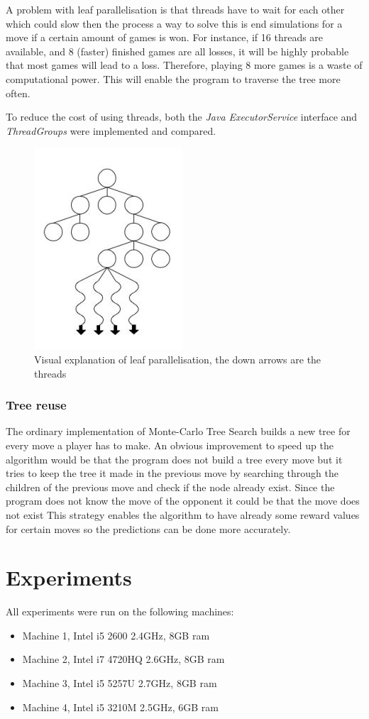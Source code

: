 \documentclass{ba-kecs}
\begin{document}
A problem with leaf parallelisation is that threads have to wait for each other which could slow then the process a way to solve this is end simulations for a move if a certain amount of games is won. For instance, if 16 threads are available, and 8 (faster) finished games are all losses, it will be highly probable that most games
will lead to a loss. Therefore, playing 8 more games is a waste of computational power. This will enable the program to traverse the tree more often.\cite{chaslot2008parallel}

To reduce the cost of using threads, both the \textit{Java ExecutorService} interface and \textit{ThreadGroups} were implemented and compared.
\begin{figure}
	\centering
	\includegraphics[]{figure_leafparallisation}
		\caption{Visual explanation of leaf parallelisation, the down arrows are the threads \cite{chaslot2008parallel}}
		\label{fig:leaf}
\end{figure}


\subsubsection{Tree reuse}
The ordinary implementation of Monte-Carlo Tree Search builds a new tree for every move a player has to make. An obvious improvement to speed up the algorithm would be that the program does not build a tree every move but it tries to keep the tree it made in the previous move by searching through the children of the previous move and check if the node already exist. Since the program does not know the move of the opponent it could be that the move does not exist This strategy enables the algorithm to have already some reward values for certain moves so the predictions can be done more accurately.

\section{Experiments}
All experiments were run on the following machines:
\begin{itemize}
	\item Machine 1, Intel i5 2600 2.4GHz, 8GB ram
	\item Machine 2, Intel i7 4720HQ 2.6GHz, 8GB ram
		\item Machine 3, Intel i5 5257U 2.7GHz, 8GB ram
	\item Machine 4, Intel i5 3210M 2.5GHz, 6GB ram
\end{itemize}
\end{document}
